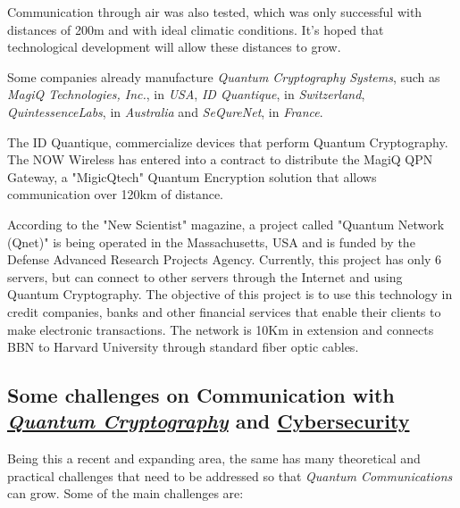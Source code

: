 \documentclass[conference]{IEEEtran}
\begin{document}
\vspace{4pt}

Communication through air was also tested, which was only successful with distances of 200m and with ideal climatic conditions. It's hoped that technological development will allow these distances to grow.

\vspace{4pt}

Some companies already manufacture \textit{Quantum Cryptography Systems}, such as \textit{MagiQ Technologies, Inc.}, in \textit{USA}, \textit{ID Quantique}, in \textit{Switzerland}, \textit{QuintessenceLabs}, in \textit{Australia} and \textit{SeQureNet}, in \textit{France}.

\vspace{4pt}

The ID Quantique, commercialize devices that perform Quantum Cryptography. The NOW Wireless has entered into a contract to distribute the MagiQ QPN Gateway, a "MigicQtech" Quantum Encryption solution that allows communication over 120km of distance.

\vspace{4pt}

According to the "New Scientist" magazine, a project called "Quantum Network (Qnet)" is being operated in the Massachusetts, USA and is funded by the Defense Advanced Research Projects Agency. Currently, this project has only 6 servers, but can connect to other servers through the Internet and using Quantum Cryptography. The objective of this project is to use this technology in credit companies, banks and other financial services that enable their clients to make electronic transactions. The network is 10Km in extension and connects BBN to Harvard University through standard fiber optic cables.

\vspace{6pt}

\subsection{Some challenges on Communication with \\\href{https://en.wikipedia.org/wiki/Quantum_cryptography}{\textit{Quantum Cryptography}} and \href{https://en.wikipedia.org/wiki/Computer_security}{Cybersecurity}}

Being this a recent and expanding area, the same has many theoretical and practical challenges that need to be addressed so that \textit{Quantum Communications} can grow. Some of the main challenges are:
\end{document}
